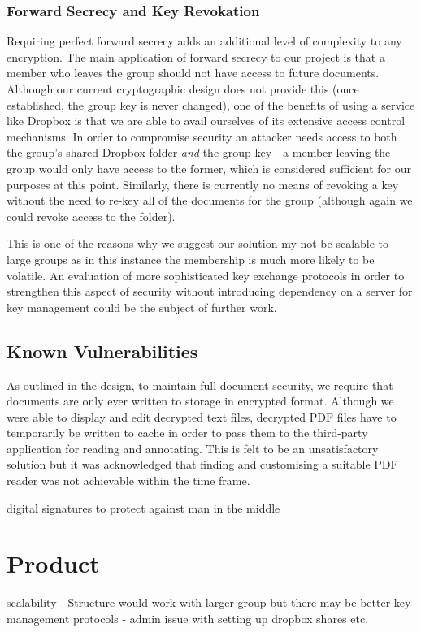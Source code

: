 \subsubsection*{Forward Secrecy and Key Revokation}
Requiring perfect forward secrecy adds an additional level of complexity to any encryption.   The main application of forward secrecy to our project is that a member who leaves the group should not have access to future documents.  Although our current cryptographic design does not provide this (once established, the group key is never changed), one of the benefits of using a service like Dropbox is that we are able to avail ourselves of its extensive access control mechanisms.  In order to compromise security an attacker needs access to both the group's shared Dropbox folder \textit{and } the group key - a member leaving the group would only have access to the former, which is considered sufficient for our purposes at this point.  Similarly, there is currently no means of revoking a key without the need to re-key all of the documents for the group (although again we could revoke access to the folder).   

This is one of the reasons why we suggest our solution my not be scalable to large groups as in this instance the membership is much more likely to be volatile.  An evaluation of more sophisticated key exchange protocols in order to strengthen this aspect of security without introducing dependency on a server for key management could be the subject of further work. 



\subsection*{Known Vulnerabilities}
As outlined in the design, to maintain full document security, we require that documents are only ever written to storage in encrypted format.  Although we were able to display and edit decrypted text files, decrypted PDF files have to temporarily be written to cache in order to pass them to the third-party application for reading and annotating.  This is felt to be an unsatisfactory solution but it was acknowledged that finding and customising a suitable PDF reader was not achievable within the time frame.  

 digital signatures to protect against man in the middle 
 
\section{Product}
scalability - Structure would work with larger group but there may be better key management protocols - admin issue with setting up dropbox shares etc.

